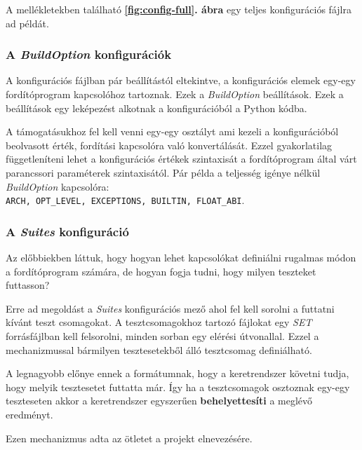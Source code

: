         \noindent
        A mellékletekben található \textbf{\ref{fig:config-full}. ábra} egy teljes konfigurációs fájlra ad példát.

        \pagebreak

        \subsubsection{A \textit{BuildOption} konfigurációk}

            A konfigurációs fájlban pár beállítástól eltekintve, a konfigurációs elemek egy-egy fordítóprogram
            kapcsolóhoz tartoznak. Ezek a \textit{BuildOption} beállítások. Ezek a beállítások egy leképezést alkotnak
            a konfigurációból a Python kódba.

            A támogatásukhoz fel kell venni egy-egy osztályt ami kezeli a konfigurációból beolvasott érték, fordítási
            kapcsolóra való konvertálását. Ezzel gyakorlatilag függetleníteni lehet a konfigurációs értékek szintaxisát
            a fordítóprogram által várt parancssori paraméterek szintaxisától. Pár példa a teljesség igénye nélkül
            \textit{BuildOption} kapcsolóra:\\ \verb|ARCH, OPT_LEVEL, EXCEPTIONS, BUILTIN, FLOAT_ABI|.

        \subsubsection{A \textit{Suites} konfiguráció}

            Az előbbiekben láttuk, hogy hogyan lehet kapcsolókat definiálni rugalmas módon a fordítóprogram számára, de
            hogyan fogja tudni, hogy milyen teszteket futtasson?

            Erre ad megoldást a \textit{Suites} konfigurációs mező ahol fel kell sorolni a futtatni kívánt teszt
            csomagokat. A tesztcsomagokhoz tartozó fájlokat egy \textit{SET} forrásfájlban kell felsorolni, minden
            sorban egy elérési útvonallal. Ezzel a mechanizmussal bármilyen tesztesetekből álló tesztcsomag
            definiálható.

            A legnagyobb előnye ennek a formátumnak, hogy a keretrendszer követni tudja, hogy melyik tesztesetet
            futtatta már. Így ha a tesztcsomagok osztoznak egy-egy teszteseten akkor a keretrendszer egyszerűen
            \textbf{behelyettesíti} a meglévő eredményt.

            Ezen mechanizmus adta az ötletet a projekt elnevezésére.

